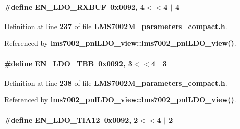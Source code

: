 \paragraph[{E\+N\+\_\+\+L\+D\+O\+\_\+\+R\+X\+B\+UF}]{\setlength{\rightskip}{0pt plus 5cm}\#define E\+N\+\_\+\+L\+D\+O\+\_\+\+R\+X\+B\+UF~0x0092, 4$<$$<$4 $\vert$  4}\label{LMS7002M__parameters__compact_8h_a55218b29a998e9114db8fbd448266d9b}


Definition at line {\bf 237} of file {\bf L\+M\+S7002\+M\+\_\+parameters\+\_\+compact.\+h}.



Referenced by {\bf lms7002\+\_\+pnl\+L\+D\+O\+\_\+view\+::lms7002\+\_\+pnl\+L\+D\+O\+\_\+view()}.

\paragraph[{E\+N\+\_\+\+L\+D\+O\+\_\+\+T\+BB}]{\setlength{\rightskip}{0pt plus 5cm}\#define E\+N\+\_\+\+L\+D\+O\+\_\+\+T\+BB~0x0092, 3$<$$<$4 $\vert$  3}\label{LMS7002M__parameters__compact_8h_a85e0f820cf7ecde60d927cff70212258}


Definition at line {\bf 238} of file {\bf L\+M\+S7002\+M\+\_\+parameters\+\_\+compact.\+h}.



Referenced by {\bf lms7002\+\_\+pnl\+L\+D\+O\+\_\+view\+::lms7002\+\_\+pnl\+L\+D\+O\+\_\+view()}.

\paragraph[{E\+N\+\_\+\+L\+D\+O\+\_\+\+T\+I\+A12}]{\setlength{\rightskip}{0pt plus 5cm}\#define E\+N\+\_\+\+L\+D\+O\+\_\+\+T\+I\+A12~0x0092, 2$<$$<$4 $\vert$  2}\label{LMS7002M__parameters__compact_8h_a983e948241833a7216aeb0699c2322aa}


